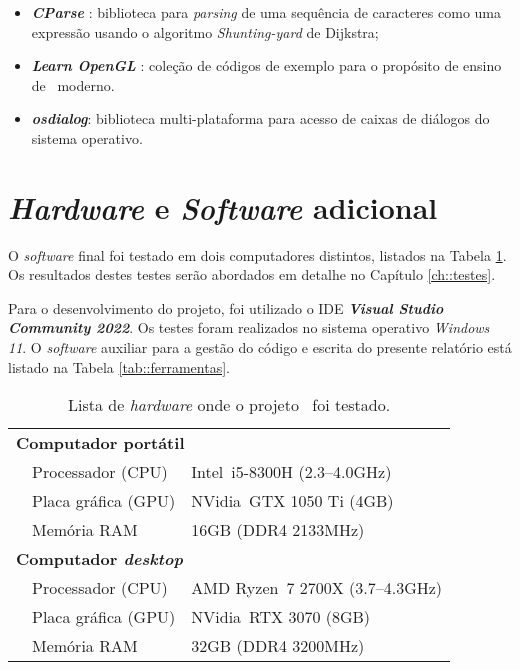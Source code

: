 \begin{itemize}
    \item \textbf{\textit{CParse}} \cite{cparse}: biblioteca para \textit{parsing} de uma sequência de caracteres como uma expressão usando o algoritmo \textit{Shunting-yard} de Dijkstra;
    
    \item \textbf{\textit{Learn OpenGL}} \cite{learnopengl}: coleção de códigos de exemplo para o propósito de ensino de \opengl~moderno.
    
    \item \textbf{\textit{osdialog}}: biblioteca multi-plataforma para acesso de caixas de diálogos do sistema operativo.
\end{itemize}


\section{\textit{Hardware} e \textit{Software} adicional}
\label{sec::tecno:hw}

O \textit{software} final foi testado em dois computadores distintos, listados na Tabela \ref{tab::hardware}. Os resultados destes testes serão abordados em detalhe no Capítulo \ref{ch::testes}.

Para o desenvolvimento do projeto, foi utilizado o \ac{IDE} \textbf{\textit{Visual Studio Community 2022}}. Os testes foram realizados no sistema operativo \textit{Windows 11}. O \textit{software} auxiliar para a gestão do código e escrita do presente relatório está listado na Tabela \ref{tab::ferramentas}.

\begin{table}[!p]
	\centering
	\caption[Lista de \textit{hardware} para testes]{Lista de \textit{hardware} onde o projeto \theapp~foi testado.}
	\label{tab::hardware}
	\begin{tabular}{p{1cm} l l}
		\toprule
		\multicolumn{3}{l}{\bfseries Computador portátil} \\
		& Processador (\acs{CPU})   & Intel\registered~i5-8300H (2.3--4.0GHz) \\
		& Placa gráfica (\acs{GPU}) & NVidia\registered~GTX 1050 Ti (4GB) \\
		& Memória \acs{RAM}         & 16GB (DDR4 2133MHz) \\
		\midrule
		\multicolumn{3}{l}{\bfseries Computador \textit{desktop}} \\
		& Processador (\acs{CPU})   & AMD Ryzen\texttrademark~7 2700X (3.7--4.3GHz) \\
		& Placa gráfica (\acs{GPU}) & NVidia\registered~RTX 3070 (8GB) \\
		& Memória \acs{RAM}         & 32GB (DDR4 3200MHz) \\
		\bottomrule
	\end{tabular}
\end{table}


%
